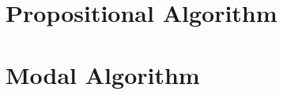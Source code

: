 \documentclass[11pt,a4paper]{article}
\begin{document}
\newpage


\appendix
\section{Propositional Algorithm}
\label{app:propalg}

\section{Modal Algorithm}
\label{app:modalg}

\end{document}
